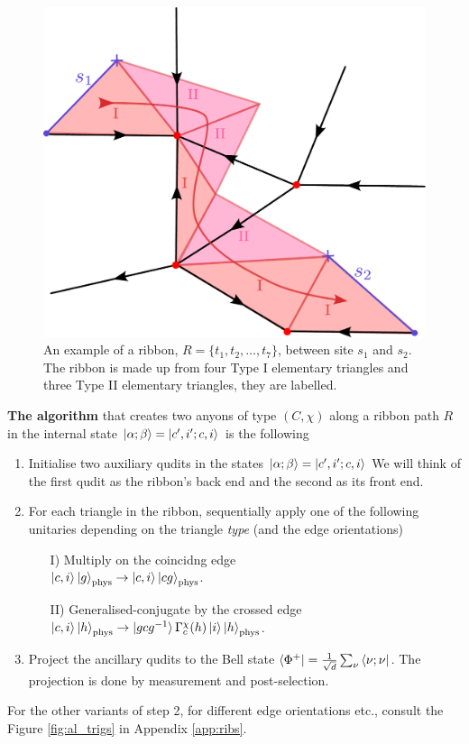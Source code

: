 \documentclass[two column]{article}
\begin{document}
\begin{figure}
    \centering
    \includegraphics[width= \linewidth]{Figures/ribbon_exampl.pdf}
    \caption{An example of a ribbon, $R = \{t_1, t_2, \ldots, t_7\}$, between site $s_1$ and $s_2$. The ribbon is made up from four Type I elementary triangles and three Type II elementary triangles, they are labelled.}
    \label{fig:rib_exampl}
\end{figure}

\textbf{The algorithm} that creates two anyons of type $(C,\chi)$ along a ribbon path $R$ in the internal state $\ket{\alpha; \beta} = \ket{c', i'; c, i}$ is the following
\begin{enumerate}
    \item Initialise two auxiliary qudits in the states $\ket{\alpha; \beta} = \ket{c', i'; c, i}$  We will think of the first qudit as the ribbon's back end and the second as its front end.
    \item For each triangle in the ribbon, sequentially apply one of the following unitaries depending on the triangle \textit{type} (and the edge orientations) 
    \begin{itemize}
        \item[I)] Multiply on the coincidng edge\\  $\ket{c, i}\ket{g}_\text{phys} \rightarrow \ket{c, i}\ket{cg}_\text{phys}$.
       \item[II)] Generalised-conjugate by the crossed edge\\ $\ket{c,i}\ket{h}_\text{phys} \rightarrow \ket{gcg^{-1}} \Gamma^\chi_c(h) \ket{i} \ket{h}_\text{phys}$.
    \end{itemize}
    \item Project the ancillary qudits to the Bell state $\bra{\Phi^+} = \frac{1}{\sqrt{d}}\sum_\nu \bra{\nu; \nu}$. The projection is done by measurement and post-selection.
\end{enumerate}
For the other variants of step 2, for different edge orientations etc., consult the Figure \ref{fig:al_trigs} in Appendix \ref{app:ribs}. 
\end{document}
